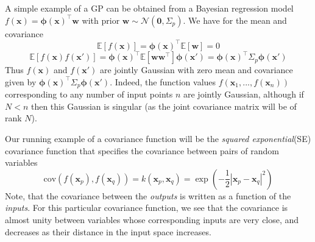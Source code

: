 \documentclass[twoside]{article}
\begin{document}
A simple example of a GP can be obtained from a Bayesian regression model $f(\boldsymbol{x}) = \boldsymbol{\phi(x)}^\intercal\boldsymbol{w}$ with prior $\boldsymbol{w} \sim \mathcal{N}(\boldsymbol{0}, \Sigma_p)$. We have for the mean and covariance
\begin{equation*}
    \mathbb{E}[f(\boldsymbol{x})] = \boldsymbol{\phi(x)}^\intercal\mathbb{E}[\boldsymbol{w}] = 0
\end{equation*}
\begin{equation*}
    \mathbb{E}[f(\boldsymbol{x})f(\boldsymbol{x'})] = \boldsymbol{\phi(x)}^\intercal\mathbb{E}[\boldsymbol{ww^\intercal}]\boldsymbol{\phi(x')} = \boldsymbol{\phi(x)}^\intercal\Sigma_p\boldsymbol{\phi(x')}
\end{equation*}
Thus $f(\boldsymbol{x})$ and $f(\boldsymbol{x'})$ are jointly Gaussian with zero mean and covariance given by $\boldsymbol{\phi(x)}^\intercal\Sigma_p\boldsymbol{\phi(x')}$. Indeed, the function values $f(\boldsymbol{x}_1,...,f(\boldsymbol{x}_n))$ corresponding to any number of input points $n$ are jointly Gaussian, although if $N < n$ then this Gaussian is singular (as the joint covariance matrix will be of rank $N$).\medskip

Our running example of a covariance function will be the \textit{squared exponential}(SE) covariance function that specifies the covariance between pairs of random variables
\begin{equation}
    \text{cov}(f(\boldsymbol{x}_p), f(\boldsymbol{x}_q)) = k(\boldsymbol{x}_p, \boldsymbol{x}_q) = \exp{(-\frac{1}{2}|\boldsymbol{x}_p - \boldsymbol{x}_q|^2)}
\end{equation}
Note, that the covariance between the \textit{outputs} is written as a function of the \textit{inputs}. For this particular covariance function, we see that the covariance is almost unity between variables whose corresponding inputs are very close, and decreases as their distance in the input space increases.\medskip
\end{document}
